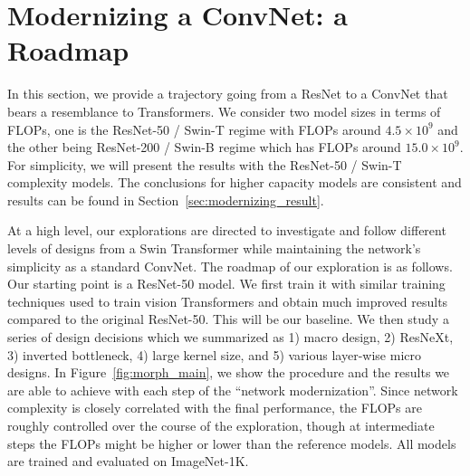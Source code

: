 \section{Modernizing a ConvNet: a Roadmap}
\label{sec:modernizing}
In this section, we provide a trajectory going from a ResNet to a ConvNet that bears a resemblance to Transformers. We consider two model sizes in terms of FLOPs, one is the ResNet-50 / Swin-T regime with FLOPs around $4.5\times 10^9$ and the other being ResNet-200 / Swin-B regime which has FLOPs around $15.0\times 10^9$. For simplicity, we will present the results with the ResNet-50 / Swin-T complexity models. The conclusions for higher capacity models are consistent and results can be found in Section~\ref{sec:modernizing_result}.

At a high level, our explorations are directed to investigate and follow different levels of designs from a Swin Transformer while maintaining the network's simplicity as a standard ConvNet. The roadmap of our exploration is as follows. Our starting point is a ResNet-50 model. We first train it with similar training techniques used to train vision Transformers and obtain much improved results compared to the original ResNet-50. This will be our baseline. We then study a series of design decisions which we summarized as 1) macro design, 2) ResNeXt, 3) inverted bottleneck, 4) large kernel size, and 5) various layer-wise micro designs. In Figure~\ref{fig:morph_main}, we show the procedure and the results we are able to achieve with each step of the ``network modernization''. Since network complexity is closely correlated with the final performance, the FLOPs are roughly controlled over the course of the exploration, though at intermediate steps the FLOPs might be higher or lower than the reference models. All models are trained and evaluated on ImageNet-1K.


